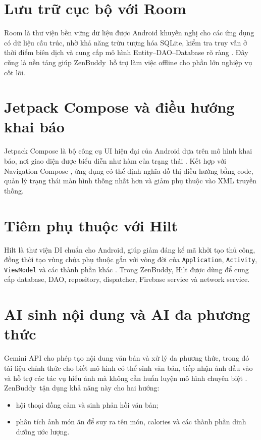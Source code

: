 \documentclass{zenbuddy-report}
\newcommand{\appname}{ZenBuddy}
\begin{document}
\section{Lưu trữ cục bộ với Room}
Room là thư viện bền vững dữ liệu được Android khuyến nghị cho các ứng dụng có dữ liệu cấu trúc, nhờ khả năng trừu tượng hóa SQLite, kiểm tra truy vấn ở thời điểm biên dịch và cung cấp mô hình Entity--DAO--Database rõ ràng \cite{android-room}. Đây cũng là nền tảng giúp \appname\ hỗ trợ làm việc offline cho phần lớn nghiệp vụ cốt lõi.

\section{Jetpack Compose và điều hướng khai báo}
Jetpack Compose là bộ công cụ UI hiện đại của Android dựa trên mô hình khai báo, nơi giao diện được biểu diễn như hàm của trạng thái \cite{android-compose-overview}. Kết hợp với Navigation Compose \cite{android-navigation-compose}, ứng dụng có thể định nghĩa đồ thị điều hướng bằng code, quản lý trạng thái màn hình thống nhất hơn và giảm phụ thuộc vào XML truyền thống.

\section{Tiêm phụ thuộc với Hilt}
Hilt là thư viện DI chuẩn cho Android, giúp giảm đáng kể mã khởi tạo thủ công, đồng thời tạo vùng chứa phụ thuộc gắn với vòng đời của \texttt{Application}, \texttt{Activity}, \texttt{ViewModel} và các thành phần khác \cite{android-hilt}. Trong \appname, Hilt được dùng để cung cấp database, DAO, repository, dispatcher, Firebase service và network service.

\section{AI sinh nội dung và AI đa phương thức}
Gemini API cho phép tạo nội dung văn bản và xử lý đa phương thức, trong đó tài liệu chính thức cho biết mô hình có thể sinh văn bản, tiếp nhận ảnh đầu vào và hỗ trợ các tác vụ hiểu ảnh mà không cần huấn luyện mô hình chuyên biệt \cite{google-gemini-quickstart,google-gemini-vision}. \appname\ tận dụng khả năng này cho hai hướng:
\begin{itemize}
  \item hội thoại đồng cảm và sinh phản hồi văn bản;
  \item phân tích ảnh món ăn để suy ra tên món, calories và các thành phần dinh dưỡng ước lượng.
\end{itemize}
\end{document}
